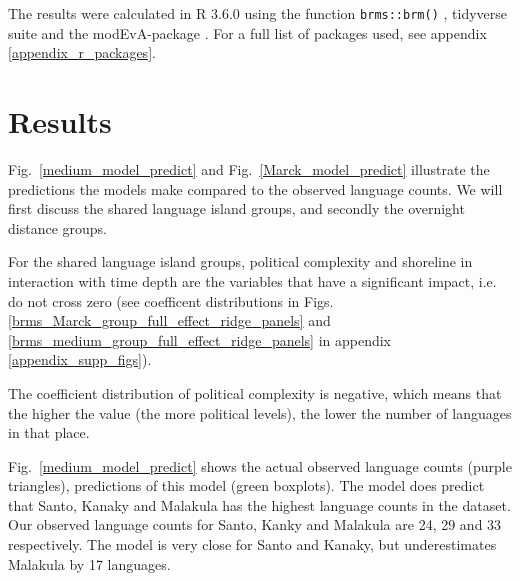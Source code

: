 \documentclass[a4paper,10pt]{article} %
\begin{document}
The results were calculated in R 3.6.0 \citep{R} using the function \texttt{brms::brm()} \citep{burkner2017brms}, tidyverse suite \citep{tidyverse13} and the modEvA-package \citep{barbosa2016package}. For a full list of packages used, see appendix \ref{appendix_r_packages}.

\FloatBarrier
\section{Results}
 
 Fig.~\ref{medium_model_predict} and Fig.~\ref{Marck_model_predict} illustrate the predictions the models make compared to the observed language counts. We will first discuss the shared language island groups, and secondly the overnight distance groups.

For the shared language island groups, political complexity and shoreline in interaction with time depth are the variables that have a significant impact, i.e. do not cross zero (see coefficent distributions in Figs. \ref{brms_Marck_group_full_effect_ridge_panels} and \ref{brms_medium_group_full_effect_ridge_panels} in appendix \ref{appendix_supp_figs}).

The coefficient distribution of political complexity is negative, which means that the higher the value (the more political levels), the lower the number of languages in that place. 

Fig.~\ref{medium_model_predict} shows the actual observed language counts (purple triangles), predictions of this model (green boxplots). The model does predict that Santo, Kanaky and Malakula has the highest language counts in the dataset. Our observed language counts for Santo, Kanky and Malakula are 24, 29 and 33 respectively. The model is very close for Santo and Kanaky, but underestimates Malakula by 17 languages.
\end{document}
